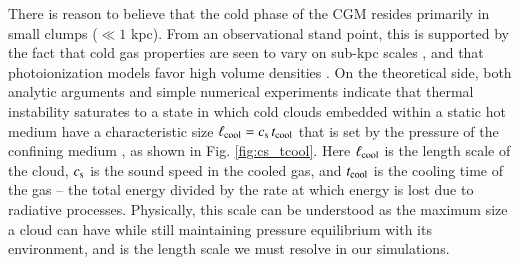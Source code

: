 \documentclass[11pt,letterpaper,english]{article}
\begin{document}
There is reason to believe that the cold phase of the CGM resides primarily in small clumps ($\ll 1$ kpc).  From an observational stand point, this is supported by the fact that cold gas properties are seen to vary on sub-kpc scales
 \cite{Rauch02, Churchill03, Lopez18}, and that photoionization models favor high volume densities \cite{Werk14,Lau16}. On the theoretical side, both analytic arguments and simple numerical experiments indicate that thermal instability saturates to a state in which cold clouds embedded within a static hot medium have a characteristic size $\ell_{\rm cool} = c_{\rm s}\, t_{\rm cool}$ that is set by the pressure of the confining medium \cite{McCourt18}, as shown in Fig. \ref{fig:cs_tcool}. Here $\ell_{\rm cool}$ is the length scale of the cloud, $c_{\rm s}$ is the sound speed in the cooled gas, and $t_{\rm cool}$ is the cooling time of the gas -- the total energy divided by the rate at which energy is lost due to radiative processes. Physically, this scale can be understood as the maximum size a cloud can have while still maintaining pressure equilibrium with its environment, and is the length scale we must resolve in our simulations.




\end{document}

